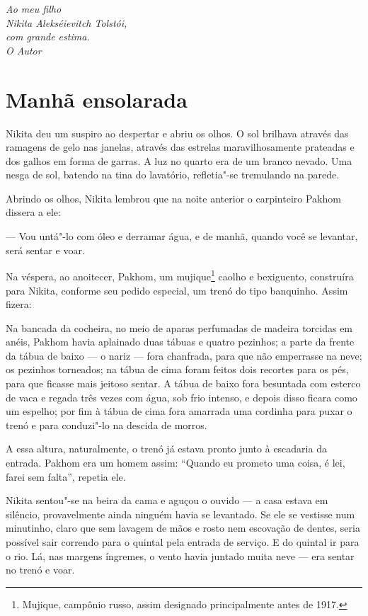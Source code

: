 \mbox{}\vfill\normalsize\thispagestyle{empty}
\noindent{}\textit{Ao meu filho\\[-5pt]
Nikita Alekséievitch Tolstói,\\[-5pt]
com grande estima.\\[-5pt]
O Autor}

\chapter{Manhã ensolarada}

Nikita deu um suspiro ao despertar e abriu os olhos. O sol brilhava
através das ramagens de gelo nas janelas, através das estrelas
maravilhosamente prateadas e dos galhos em forma de garras. A luz no
quarto era de um branco nevado. Uma nesga de sol, batendo na tina do
lavatório, refletia"-se tremulando na parede.

Abrindo os olhos, Nikita lembrou que na noite anterior o carpinteiro
Pakhom dissera a ele:

--- Vou untá"-lo com óleo e derramar água, e de manhã, quando você se
levantar, será sentar e voar.

Na véspera, ao anoitecer, Pakhom, um mujique\footnote{Mujique, campônio russo, assim designado principalmente antes de 1917.} caolho e bexiguento,
construíra para Nikita, conforme seu pedido especial, um trenó do tipo
banquinho. Assim fizera:

Na bancada da cocheira, no meio de aparas perfumadas de madeira torcidas
em anéis, Pakhom havia aplainado duas tábuas e quatro pezinhos; a parte da
frente da tábua de baixo --- o nariz --- fora chanfrada, para que não
emperrasse na neve; os pezinhos torneados; na tábua de cima foram
feitos dois recortes para os pés, para que ficasse mais jeitoso sentar.
A tábua de baixo fora besuntada com esterco de vaca e regada três vezes
com água, sob frio intenso, e depois disso ficara como um espelho; por
fim à tábua de cima fora amarrada uma cordinha para puxar o trenó e para
conduzi"-lo na descida de morros.

A essa altura, naturalmente, o trenó já estava pronto junto à escadaria
da entrada. Pakhom era um homem assim: ``Quando eu prometo uma coisa, é
lei, farei sem falta'', repetia ele.

Nikita sentou"-se na beira da cama e aguçou o ouvido --- a casa estava em
silêncio, provavelmente ainda ninguém havia se levantado. Se ele se
vestisse num minutinho, claro que sem lavagem de mãos e rosto nem
escovação de dentes, seria possível sair correndo para o quintal pela
entrada de serviço. E do quintal ir para o rio. Lá, nas margens
íngremes, o vento havia juntado muita neve --- era sentar no trenó e
voar.

